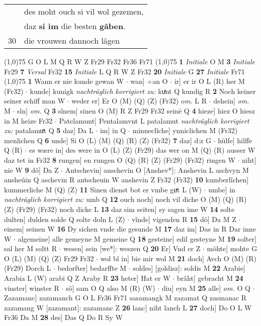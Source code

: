 \documentclass[8pt,a4paper,notitlepage]{article}
\begin{document}
\begin{table}[ht]
\begin{minipage}[t]{0.5\linewidth}
\begin{tabular}{rl}
 & des moht ouch si vil wol gezemen,\\ 
 & daz \textbf{si im} die besten \textbf{gâben}.\\ 
30 & die vrouwen dannoch lâgen\\ 
\end{tabular}
\scriptsize
\line(1,0){75} \newline
G O L M Q R W Z Fr29 Fr32 Fr36 Fr71 \newline
\line(1,0){75} \newline
\textbf{1} \textit{Initiale} O M  \textbf{3} \textit{Initiale} Fr29  \textbf{7} \textit{Versal} Fr32  \textbf{15} \textit{Initiale} L Q R W Z Fr32  \textbf{20} \textit{Initiale} G  \textbf{27} \textit{Initiale} Fr71  \newline
\line(1,0){75} \newline
\textbf{1} Wann er nie kunde gewan W  $\cdot$ wan] ÷an O  $\cdot$ ir] er ir O L (R) her M (Fr32)  $\cdot$ kunde] kunigk \textit{nachträglich korrigiert zu:} kuͯnt Q kundig R \textbf{2} Noch keiner seiner schiff man W  $\cdot$ weder er] Er O (M) (Q) (Z) (Fr32) o\textit{m. } L R  $\cdot$ dehein] \textit{om.} M  $\cdot$ sîn] \textit{om.} Q \textbf{3} sînem] sinen O (M) R Z Fr29 Fr32 seinē Q \textbf{4} hieze] hiez O hiesz in M heize Fr32  $\cdot$ Patelamunt] Pentalamvnt L patalamut \textit{nachträglich korrigiert zu:} patalamuͯt Q \textbf{5} daz] Da L  $\cdot$ im] in Q  $\cdot$ minneclîche] ynniclichen M (Fr32) menlichen Q \textbf{6} unde] Si O (L) (M) (Q) (R) (Z) (Fr32) \textbf{7} daz] d:z G  $\cdot$ hülfe] hilffe Q (R)  $\cdot$ es wære in] des were in O (L) (Z) (Fr29) das wer on M (Q) (R) ausser W daz tet in Fr32 \textbf{8} rungen] en rungen O (Q) (R) (Z) (Fr29) (Fr32) ringen W  $\cdot$ niht] nie W \textbf{9} dô] Da Z  $\cdot$ Antschevin] anschevin O [Anshev*]: Anshevin L aschvyn M ansheúin Q aschevin R antscheuin W anshevin Z Fr32 (Fr32) \textbf{10} kumberlîchen] kummerliche M (Q) (Z) \textbf{11} Sinen dienst bot er vmbe guͯt L (W)  $\cdot$ umbe] in \textit{nachträglich korrigiert zu:} umb Q \textbf{12} ouch noch] noch vil diche O (M) (Q) (R) (Z) (Fr29) (Fr32) noch dicke L \textbf{13} daz sim seiten] sy sagen ime W \textbf{14} solte dulten] dulden solde Q solte doln L (Z)  $\cdot$ vînde] vigenden R \textbf{15} dô] Da M Z  $\cdot$ einem] seinen W \textbf{16} Dy sichen vnde die gesunde M \textbf{17} daz im] Das in R Dar inne W  $\cdot$ algemeine] alle gemeyne M gemeine Q \textbf{18} gesteine] edil gesteyne M \textbf{19} solter] sal her M soltt R  $\cdot$ wesen] sein [we*]: weszen Q \textbf{20} Er] Vnd er Z  $\cdot$ möhte] mohte G O (L) (M) (Q) (Z) Fr29 Fr32  $\cdot$ wol bî in] bie mir wol M \textbf{21} doch] Avch O (M) (R) (Fr29) Dorch L  $\cdot$ bedorfter] bedarffte M  $\cdot$ soldes] [goldisz]: soldis M \textbf{22} Arabie] Arabia L (W) arabi Q Z Araby R \textbf{23} heter] Hat er W  $\cdot$ brâht] gebracht M \textbf{24} vinster] winster R  $\cdot$ sô] sam O Q also M (R) (W)  $\cdot$ diu] eyn M \textbf{25} alle] \textit{om.} O Q  $\cdot$ Zazamanc] zazamanch G O L Fr36 Fr71 sasamangk M zazamat Q zasmanac R zazamang W [zazamant]: zazamanc Z \textbf{26} lanc] niht lanch L \textbf{27} doch] Do O L W Fr36 Da M \textbf{28} des] Das Q Do R Sy W  
\end{minipage}
\end{table}
\end{document}
